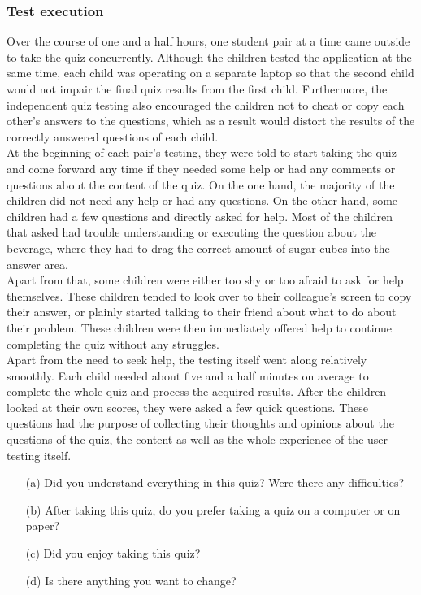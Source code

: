 \subsubsection{Test execution}
Over the course of one and a half hours, one student pair at a time came outside to take the quiz concurrently. Although the children tested the application at the same time, each child was operating on a separate laptop so that the second child would not impair the final quiz results from the first child. Furthermore, the independent quiz testing also encouraged the children not to cheat or copy each other's answers to the questions, which as a result would distort the results of the correctly answered questions of each child. \\
At the beginning of each pair's testing, they were told to start taking the quiz and come forward any time if they needed some help or had any comments or questions about the content of the quiz.
On the one hand, the majority of the children did not need any help or had any questions. On the other hand, some children had a few questions and directly asked for help. Most of the children that asked had trouble understanding or executing the question about the beverage, where they had to drag the correct amount of sugar cubes into the answer area.\\
Apart from that, some children were either too shy or too afraid to ask for help themselves. These children tended to look over to their colleague's screen to copy their answer, or plainly started talking to their friend about what to do about their problem. These children were then immediately offered help to continue completing the quiz without any struggles.\\
Apart from the need to seek help, the testing itself went along relatively smoothly. Each child needed about five and a half minutes on average to complete the whole quiz and process the acquired results. After the children looked at their own scores, they were asked a few quick questions. These questions had the purpose of collecting their thoughts and opinions about the questions of the quiz, the content as well as the whole experience of the user testing itself.
\begin{itemize}
    \item[(a)] Did you understand everything in this quiz? Were there any difficulties?
    \item[(b)] After taking this quiz, do you prefer taking a quiz on a computer or on paper?
    \item[(c)] Did you enjoy taking this quiz?
    \item[(d)] Is there anything you want to change?
\end{itemize}
